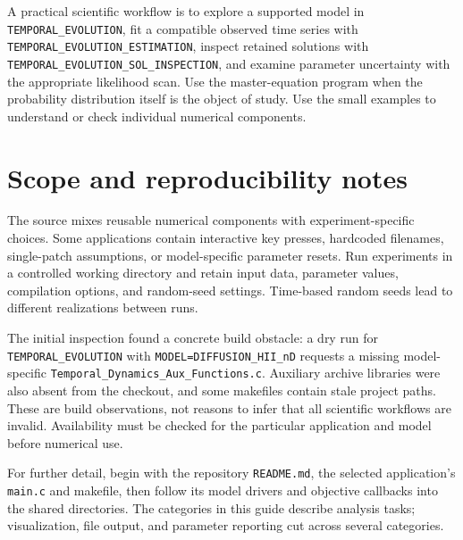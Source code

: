 \documentclass[11pt,a4paper]{article}
\DeclareRobustCommand{\code}[1]{\nolinkurl{#1}}
\begin{document}
A practical scientific workflow is to explore a supported model in \code{TEMPORAL_EVOLUTION}, fit a compatible observed time series with \code{TEMPORAL_EVOLUTION_ESTIMATION}, inspect retained solutions with \code{TEMPORAL_EVOLUTION_SOL_INSPECTION}, and examine parameter uncertainty with the appropriate likelihood scan. Use the master-equation program when the probability distribution itself is the object of study. Use the small examples to understand or check individual numerical components.

\section{Scope and reproducibility notes}
The source mixes reusable numerical components with experiment-specific choices. Some applications contain interactive key presses, hardcoded filenames, single-patch assumptions, or model-specific parameter resets. Run experiments in a controlled working directory and retain input data, parameter values, compilation options, and random-seed settings. Time-based random seeds lead to different realizations between runs.

The initial inspection found a concrete build obstacle: a dry run for \code{TEMPORAL_EVOLUTION} with \code{MODEL=DIFFUSION_HII_nD} requests a missing model-specific \code{Temporal_Dynamics_Aux_Functions.c}. Auxiliary archive libraries were also absent from the checkout, and some makefiles contain stale project paths. These are build observations, not reasons to infer that all scientific workflows are invalid. Availability must be checked for the particular application and model before numerical use.

For further detail, begin with the repository \code{README.md}, the selected application's \code{main.c} and makefile, then follow its model drivers and objective callbacks into the shared directories. The categories in this guide describe analysis tasks; visualization, file output, and parameter reporting cut across several categories.
\end{document}
